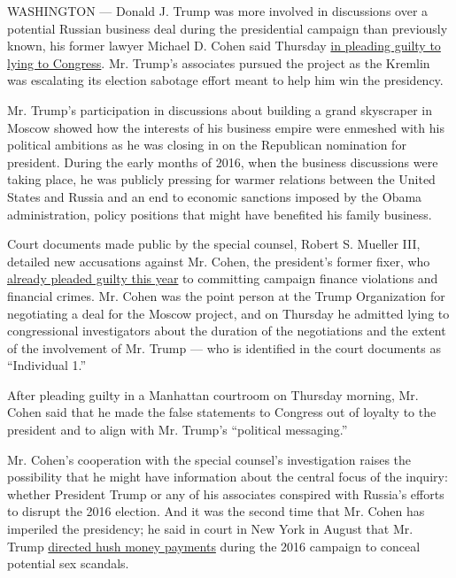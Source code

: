 WASHINGTON --- Donald J. Trump was more involved in discussions over a
potential Russian business deal during the presidential campaign than
previously known, his former lawyer Michael D. Cohen said Thursday
\href{https://int.graylady3jvrrxbe.onion/data/documenthelper/501-michael-cohen-court-transcript/ddd84d2b0f5a3425ebc5/optimized/full.pdf\#page=1}{in
pleading guilty to lying to Congress}. Mr. Trump's associates pursued
the project as the Kremlin was escalating its election sabotage effort
meant to help him win the presidency.

Mr. Trump's participation in discussions about building a grand
skyscraper in Moscow showed how the interests of his business empire
were enmeshed with his political ambitions as he was closing in on the
Republican nomination for president. During the early months of 2016,
when the business discussions were taking place, he was publicly
pressing for warmer relations between the United States and Russia and
an end to economic sanctions imposed by the Obama administration, policy
positions that might have benefited his family business.

Court documents made public by the special counsel, Robert S. Mueller
III, detailed new accusations against Mr. Cohen, the president's former
fixer, who
\href{https://www.nytimes3xbfgragh.onion/2018/08/21/nyregion/michael-cohen-guilty-plea-trump-takeaways.html}{already
pleaded guilty this year} to committing campaign finance violations and
financial crimes. Mr. Cohen was the point person at the Trump
Organization for negotiating a deal for the Moscow project, and on
Thursday he admitted lying to congressional investigators about the
duration of the negotiations and the extent of the involvement of Mr.
Trump --- who is identified in the court documents as ``Individual 1.''

After pleading guilty in a Manhattan courtroom on Thursday morning, Mr.
Cohen said that he made the false statements to Congress out of loyalty
to the president and to align with Mr. Trump's ``political messaging.''

Mr. Cohen's cooperation with the special counsel's investigation raises
the possibility that he might have information about the central focus
of the inquiry: whether President Trump or any of his associates
conspired with Russia's efforts to disrupt the 2016 election. And it was
the second time that Mr. Cohen has imperiled the presidency; he said in
court in New York in August that Mr. Trump
\href{https://www.nytimes3xbfgragh.onion/2018/08/21/nyregion/michael-cohen-plea-deal-trump.html}{directed
hush money payments} during the 2016 campaign to conceal potential sex
scandals.

